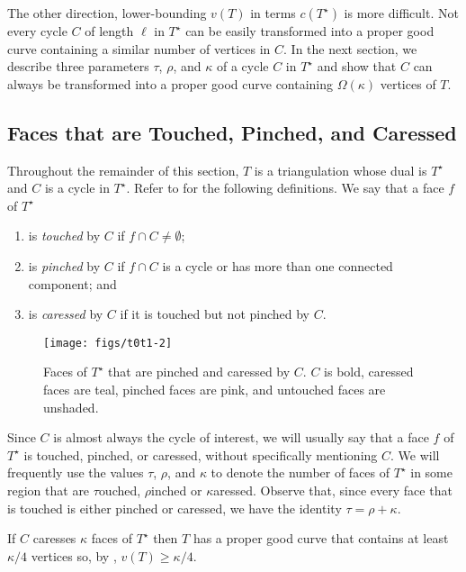 \documentclass[a4paper,UKenglish]{socg-lipics-v2019}
\newcommand{\dual}[1]{{#1}^\star}
\begin{document}
The other direction, lower-bounding $v(T)$ in terms $c(\dual{T})$
is more difficult. Not every cycle $C$ of length $\ell$ in $\dual{T}$
can be easily transformed into a proper good curve containing a similar
number of vertices in $C$.  In the next section, we describe three
parameters $\tau$, $\rho$, and $\kappa$ of a cycle $C$ in $\dual{T}$
and show that $C$ can always be transformed into a proper good curve
containing $\Omega(\kappa)$ vertices of $T$.

\subsection{Faces that are Touched, Pinched, and Caressed}

Throughout the remainder of this section, $T$ is a triangulation
whose dual is $\dual{T}$ and $C$ is a cycle in $\dual{T}$.
Refer to  for the following definitions.
We say that a face $f$ of $\dual{T}$
\begin{enumerate}
  \item is \emph{touched} by $C$ if $f\cap C\neq \emptyset$;
  \item is \emph{pinched} by $C$ if $f\cap C$ is a cycle or has more than 
    one connected component; and
  \item is \emph{caressed} by $C$ if it is touched but not pinched by $C$.
\end{enumerate}

\begin{figure}
  \begin{center}
    \texttt{[image: figs/t0t1-2]}
  \end{center}
  \caption{Faces of $\dual{T}$ that are pinched and caressed by $C$. $C$
  is bold, caressed faces are teal, pinched faces are pink, and untouched
  faces are unshaded.} 
\end{figure}


Since $C$ is almost always the cycle of interest, we will usually say
that a face $f$ of $\dual{T}$ is touched, pinched, or caressed, without
specifically mentioning $C$.  We will frequently use the values $\tau$,
$\rho$, and $\kappa$ to denote the number of faces of $\dual{T}$ in
some region that are $\tau$ouched, $\rho$inched or $\kappa$aressed.
Observe that, since every face that is touched is either pinched or
caressed, we have the identity $\tau = \rho + \kappa$.

\begin{lem}
   If $C$ caresses $\kappa$ faces of $\dual{T}$ then $T$ has a proper
   good curve that contains at least $\kappa/4$ vertices so, by
   , $v(T)\ge \kappa/4$.
\end{lem}
\end{document}
